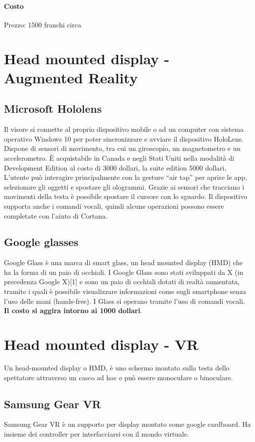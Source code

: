 \documentclass[8pt]{extarticle}
\begin{document}
\begin{multicols}{3}
\paragraph{Costo}
Prezzo: 1500 franchi circa
\section{Head mounted display - Augmented Reality}
\subsection{Microsoft Hololens}
Il visore si connette al proprio dispositivo mobile o ad un computer con sistema operativo Windows 10 per poter sincronizzare e avviare il dispositivo HoloLens.
Dispone di sensori di movimento, tra cui un giroscopio, un magnetometro e un accelerometro.
È acquistabile in Canada e negli Stati Uniti nella modalità di Development Edition al costo di 3000 dollari, la suite edition 5000 dollari.
L’utente può interagire principalmente con la gesture “air tap” per aprire le app, selezionare gli oggetti e spostare gli ologrammi. Grazie ai sensori che tracciano i movimenti della testa è possibile spostare il cursore con lo sguardo. Il dispositivo supporta anche i comandi vocali, quindi alcune operazioni possono essere completate con l’aiuto di Cortana.
\subsection{Google glasses}
Google Glass è una marca di smart glass, un head mounted display (HMD) che ha la forma di un paio di occhiali. I Google Glass sono stati sviluppati da X (in precedenza Google X)[1] e sono un paio di occhiali dotati di realtà aumentata, tramite i quali è possibile visualizzare informazioni come sugli smartphone senza l'uso delle mani (hands-free). I Glass si operano tramite l'uso di comandi vocali.
\textbf{Il costo si aggira intorno ai 1000 dollari}.

\section{Head mounted display - VR}
Un head-mounted display o HMD, è uno schermo montato sulla testa dello spettatore attraverso un casco ad hoc e può essere monoculare o binoculare.
\subsection{Samsung Gear VR}
Samsung Gear VR è un supporto per display montato come google cardboard.
Ha insieme dei controller per interfacciarsi con il mondo virtuale.

\end{multicols}
\end{document}
